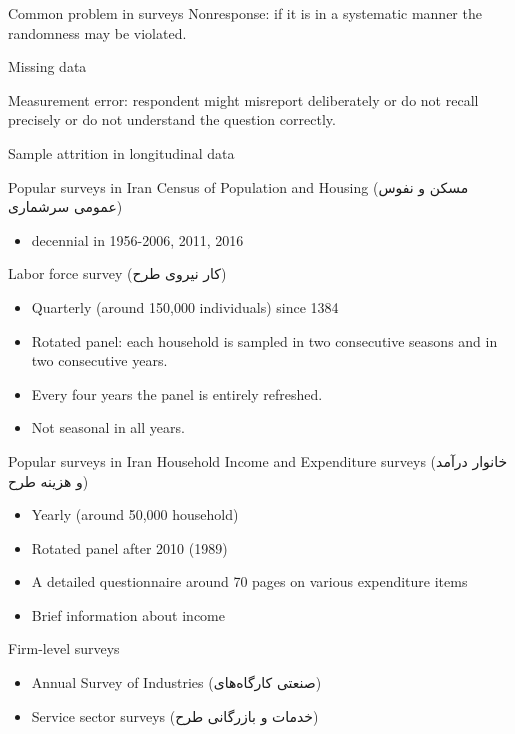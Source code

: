 \documentclass[handout]{beamer}
\begin{document}
\begin{frame}{Common problem in surveys}
Nonresponse: if it is in a systematic manner the randomness may be violated.\bigskip

Missing data\bigskip

Measurement error: respondent might misreport deliberately or do not recall precisely or do not understand the question correctly.\bigskip

Sample attrition in longitudinal data

\end{frame}


\begin{frame}{Popular surveys in Iran}
Census of Population and Housing ({\FA مسکن و نفوس عمومی سرشماری})
\begin{itemize}
	\item decennial in 1956-2006, 2011, 2016
\end{itemize}\bigskip


Labor force survey ({\FA کار نیروی طرح})
\begin{itemize}
	\item Quarterly (around 150,000 individuals) since 1384
	\item Rotated panel: each household is sampled in two consecutive seasons and in two consecutive years. 
	\item Every four years the panel is entirely refreshed.
	\item Not seasonal in all years.
\end{itemize}

\end{frame}

\begin{frame}{Popular surveys in Iran}
Household Income and Expenditure surveys ({\FA خانوار درآمد و هزینه طرح})
\begin{itemize}
\item Yearly (around 50,000 household)
\item Rotated panel after 2010 (1989)
\item A detailed questionnaire around 70 pages on various expenditure items
\item Brief information about income
\end{itemize}\bigskip

{Firm-level surveys}
\begin{itemize}
\item Annual Survey of Industries ({\FA صنعتی کارگاه‌های})
\item Service sector surveys ({\FA خدمات و بازرگانی طرح})
\end{itemize}

\end{frame}
\end{document}
